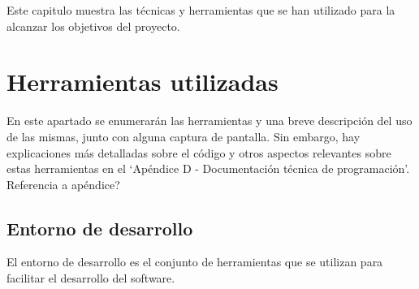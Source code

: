 
Este capitulo muestra las técnicas y herramientas que se han utilizado para la alcanzar los objetivos del proyecto. 

\section{Herramientas utilizadas}

En este apartado se enumerarán las herramientas y una breve descripción del uso de las mismas, junto con alguna captura de pantalla. Sin embargo, hay explicaciones más detalladas sobre el código y otros aspectos relevantes sobre estas herramientas en el `Apéndice D - Documentación técnica de programación'. \todo Referencia a apéndice?

\subsection{Entorno de desarrollo}
El entorno de desarrollo es el conjunto de herramientas que se utilizan para facilitar el desarrollo del software.

